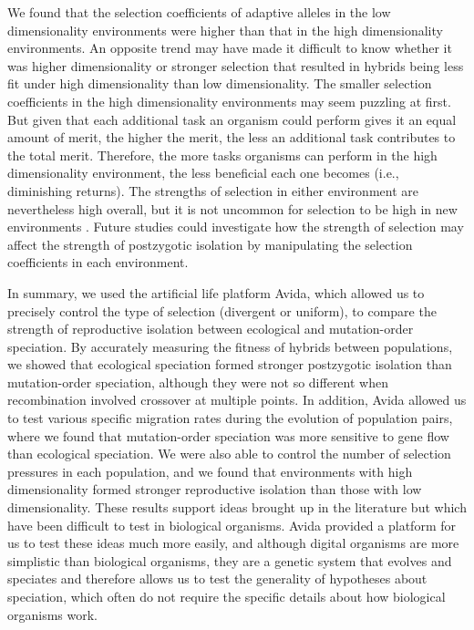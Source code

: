 \begin{doublespace}
We found that the selection coefficients of adaptive alleles
in the low dimensionality environments were higher
than that in the high dimensionality environments.
%
An opposite trend may have made it difficult to know whether
it was higher dimensionality or stronger selection that resulted
in hybrids being less fit under high dimensionality than low dimensionality.
%
The smaller selection coefficients in the high dimensionality environments
may seem puzzling at first.
%
But given that each additional task an organism could perform gives it
an equal amount of merit, the higher the merit, the less an additional task
contributes to the total merit.
%
Therefore, the more tasks organisms can perform in the high dimensionality
environment, the less beneficial each one becomes (i.e., diminishing returns).
%
The strengths of selection in either environment are nevertheless high overall,
but it is not uncommon for selection to be high in new environments
\citep[e.g.,][]{len91,det07}.
%
Future studies could investigate how the strength of selection may affect
the strength of postzygotic isolation
by manipulating the selection coefficients in each environment.



In summary, we used the artificial life platform Avida, which allowed us to
precisely control the type of selection (divergent or uniform), to compare the
strength of reproductive isolation between ecological and mutation-order
speciation.
%
By accurately measuring the fitness of hybrids between populations, we showed
that ecological speciation formed stronger postzygotic isolation than
mutation-order speciation, although they were not so different when
recombination involved crossover at multiple points.
%
In addition, Avida allowed us to test various specific migration rates during
the evolution of population pairs, where we found that mutation-order
speciation was more sensitive to gene flow than ecological speciation.
%
We were also able to control the number of selection pressures in each
population, and we found that environments with high dimensionality formed
stronger reproductive isolation than those with low dimensionality.
%
These results support ideas brought up in the literature but which have been
difficult to test in biological organisms.
%
Avida provided a platform for us to test these ideas much more easily, and
although digital organisms are more simplistic than biological organisms, they
are a genetic system that evolves and speciates and therefore allows us to test
the generality of hypotheses about speciation, which often do not require the
specific details about how biological organisms work.




\end{doublespace}
